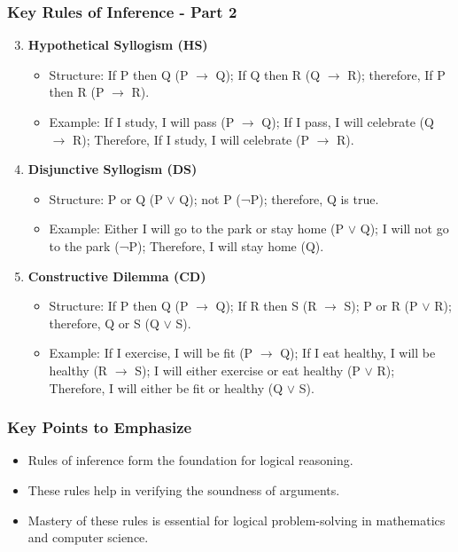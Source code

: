 \documentclass[aspectratio=169]{beamer}
\begin{document}
\begin{frame}[fragile]
    \frametitle{Key Rules of Inference - Part 2}
    \begin{enumerate}
        \setcounter{enumi}{2}
        \item \textbf{Hypothetical Syllogism (HS)}
            \begin{itemize}
                \item Structure: If P then Q (P $\rightarrow$ Q); If Q then R (Q $\rightarrow$ R); therefore, If P then R (P $\rightarrow$ R).
                \item Example: If I study, I will pass (P $\rightarrow$ Q); If I pass, I will celebrate (Q $\rightarrow$ R); Therefore, If I study, I will celebrate (P $\rightarrow$ R).
            \end{itemize}

        \item \textbf{Disjunctive Syllogism (DS)}
            \begin{itemize}
                \item Structure: P or Q (P $\lor$ Q); not P (¬P); therefore, Q is true.
                \item Example: Either I will go to the park or stay home (P $\lor$ Q); I will not go to the park (¬P); Therefore, I will stay home (Q).
            \end{itemize}

        \item \textbf{Constructive Dilemma (CD)}
            \begin{itemize}
                \item Structure: If P then Q (P $\rightarrow$ Q); If R then S (R $\rightarrow$ S); P or R (P $\lor$ R); therefore, Q or S (Q $\lor$ S).
                \item Example: If I exercise, I will be fit (P $\rightarrow$ Q); If I eat healthy, I will be healthy (R $\rightarrow$ S); I will either exercise or eat healthy (P $\lor$ R); Therefore, I will either be fit or healthy (Q $\lor$ S).
            \end{itemize}
    \end{enumerate}
\end{frame}

\begin{frame}[fragile]
    \frametitle{Key Points to Emphasize}
    \begin{itemize}
        \item Rules of inference form the foundation for logical reasoning.
        \item These rules help in verifying the soundness of arguments.
        \item Mastery of these rules is essential for logical problem-solving in mathematics and computer science.
    \end{itemize}
\end{frame}
\end{document}

